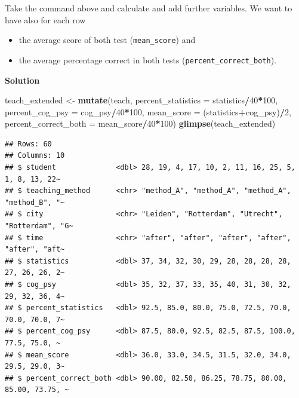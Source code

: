 \documentclass[
]{scrartcl}
\makeatletter
\newenvironment{Shaded}{\begin{snugshade}}{\end{snugshade}}
\newcommand{\DataTypeTok}[1]{\textcolor[rgb]{0.13,0.29,0.53}{#1}}
\newcommand{\DecValTok}[1]{\textcolor[rgb]{0.00,0.00,0.81}{#1}}
\newcommand{\KeywordTok}[1]{\textcolor[rgb]{0.13,0.29,0.53}{\textbf{#1}}}
\newcommand{\NormalTok}[1]{#1}
\newcommand{\OperatorTok}[1]{\textcolor[rgb]{0.81,0.36,0.00}{\textbf{#1}}}
\newcommand{\StringTok}[1]{\textcolor[rgb]{0.31,0.60,0.02}{#1}}
\providecommand{\tightlist}{%
  \setlength{\itemsep}{0pt}\setlength{\parskip}{0pt}}
\newenvironment{kframe}{%
\medskip{}
\setlength{\fboxsep}{.8em}
 \def\at@end@of@kframe{}%
 \ifinner\ifhmode%
  \def\at@end@of@kframe{\end{minipage}}%
  \begin{minipage}{\columnwidth}%
 \fi\fi%
 \def\FrameCommand##1{\hskip\@totalleftmargin \hskip-\fboxsep
 \colorbox{shadecolor}{##1}\hskip-\fboxsep
     \hskip-\linewidth \hskip-\@totalleftmargin \hskip\columnwidth}%
 \MakeFramed {\advance\hsize-\width
   \@totalleftmargin\z@ \linewidth\hsize
   \@setminipage}}%
 {\par\unskip\endMakeFramed%
 \at@end@of@kframe}
\newenvironment{rmdblock}[1]
  {
  \begin{itemize}
  \renewcommand{\labelitemi}{
    \raisebox{-.7\height}[0pt][0pt]{
      {\setkeys{Gin}{width=3em,keepaspectratio}\texttt{[image: images/\#1]}}
    }
  }
  \setlength{\fboxsep}{1em}
  \begin{kframe}
  \item
  }
  {
  \end{kframe}
  \end{itemize}
  }
\newenvironment{myexercise}
    {\begin{rmdblock}{exercise_green}}
    {\end{rmdblock}}
\newenvironment{webexsolution}[1]
    {\par\tiny\textbf{#1}}
    {\par}
\newcommand{\webexhide}[1]{\begin{webexsolution}{#1}}
\newcommand{\webexunhide}{\end{webexsolution}}
\makeatother
\begin{document}
\webexunhide

\begin{myexercise}
 Take the command above and calculate and add further variables. We want
 to have also for each row
 
 \begin{itemize}
 \tightlist
 \item
   the average score of both test (\texttt{mean\_score}) and
 \item
   the average percentage correct in both tests
   (\texttt{percent\_correct\_both}).
 \end{itemize}
 \end{myexercise}
\webexhide{Solution}

\begin{Shaded}
\begin{Highlighting}[]
\NormalTok{teach\_extended \textless{}{-}}\StringTok{ }\KeywordTok{mutate}\NormalTok{(teach, }\DataTypeTok{percent\_statistics =}\NormalTok{ statistics}\OperatorTok{/}\DecValTok{40}\OperatorTok{*}\DecValTok{100}\NormalTok{,}
              \DataTypeTok{percent\_cog\_psy =}\NormalTok{ cog\_psy}\OperatorTok{/}\DecValTok{40}\OperatorTok{*}\DecValTok{100}\NormalTok{,}
              \DataTypeTok{mean\_score =}\NormalTok{ (statistics}\OperatorTok{+}\NormalTok{cog\_psy)}\OperatorTok{/}\DecValTok{2}\NormalTok{,}
              \DataTypeTok{percent\_correct\_both =}\NormalTok{ mean\_score}\OperatorTok{/}\DecValTok{40}\OperatorTok{*}\DecValTok{100}\NormalTok{)}
\KeywordTok{glimpse}\NormalTok{(teach\_extended)}
\end{Highlighting}
\end{Shaded}

\begin{verbatim}
## Rows: 60
## Columns: 10
## $ student              <dbl> 28, 19, 4, 17, 10, 2, 11, 16, 25, 5, 1, 8, 13, 22~
## $ teaching_method      <chr> "method_A", "method_A", "method_A", "method_B", "~
## $ city                 <chr> "Leiden", "Rotterdam", "Utrecht", "Rotterdam", "G~
## $ time                 <chr> "after", "after", "after", "after", "after", "aft~
## $ statistics           <dbl> 37, 34, 32, 30, 29, 28, 28, 28, 28, 27, 26, 26, 2~
## $ cog_psy              <dbl> 35, 32, 37, 33, 35, 40, 31, 30, 32, 29, 32, 36, 4~
## $ percent_statistics   <dbl> 92.5, 85.0, 80.0, 75.0, 72.5, 70.0, 70.0, 70.0, 7~
## $ percent_cog_psy      <dbl> 87.5, 80.0, 92.5, 82.5, 87.5, 100.0, 77.5, 75.0, ~
## $ mean_score           <dbl> 36.0, 33.0, 34.5, 31.5, 32.0, 34.0, 29.5, 29.0, 3~
## $ percent_correct_both <dbl> 90.00, 82.50, 86.25, 78.75, 80.00, 85.00, 73.75, ~
\end{verbatim}
\end{document}
